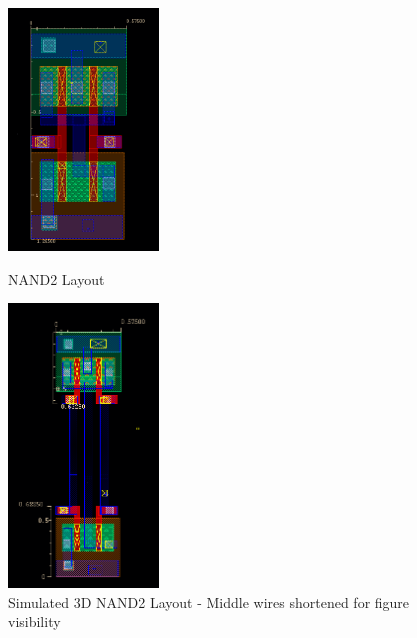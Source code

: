 \documentclass{article}
\begin{document}
\begin{figure}[h]
\centering
\parbox{8cm}{
\includegraphics[width=4cm]{step3}
  \caption{NAND2 Layout}
\label{step3}}
\qquad
\begin{minipage}{7cm}
\includegraphics[width=4cm]{3d_layout}
  \caption{Simulated 3D NAND2 Layout - Middle wires shortened for figure visibility}
\label{3d_layout}
\end{minipage}
\end{figure}
\end{document}
